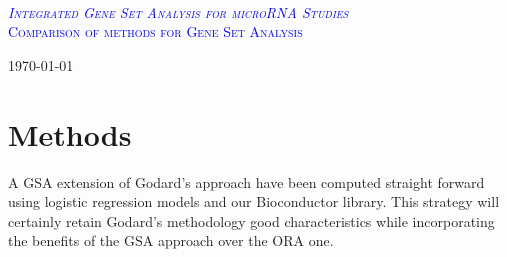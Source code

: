 \documentclass[a4paper,12pt]{article}
\begin{document}
\begin{titlepage}

\begin{center}

\textsc{ }\\[2cm]


\textsc{\textcolor{blue}{\Huge \em Integrated Gene Set Analysis for microRNA Studies}}\\[2.5cm]

\textsc{\textcolor{blue}{\Large Comparison of methods for Gene Set Analysis}}\\[2.5cm]










\vfill

{\large \today}

\end{center}

\end{titlepage}



\tableofcontents


\cleardoublepage




\section{Methods}\label{secMethods}


A GSA extension of Godard’s approach have been  computed straight forward using logistic regression
models and our Bioconductor library. This strategy will certainly retain Godard’s methodology good
characteristics while incorporating the benefits of the GSA approach over the ORA one.
\end{document}
